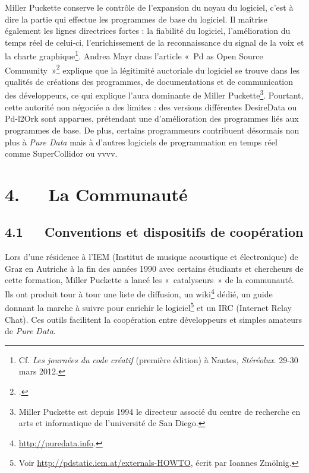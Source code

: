 \documentclass{FramateX}
\begin{document}
\begin{refsection}
Miller Puckette conserve le contrôle de l'expansion du noyau du
logiciel, c'est à dire la partie qui effectue les
programmes de base du logiciel. Il maîtrise également les lignes
directrices fortes : la fiabilité du logiciel, l'amélioration du temps
réel de celui-ci, l'enrichissement de la reconnaissance du signal de la
voix et la charte graphique\footnote{Cf. \textit{Les journées du code créatif}
(première édition) à Nantes, \textit{Stéréolux}. 29-30 mars 2012.}. Andrea
Mayr dans l'article «~Pd as Open Source Community~»\footnote{\cite{Mayr2004}.}
explique que la légitimité auctoriale du logiciel se trouve dans les
qualités de créations des programmes, de documentations et de
communication des développeurs, ce qui explique l'aura dominante de
Miller Puckette\footnote{Miller Puckette est depuis 1994 le directeur
associé du centre de recherche en arts et informatique de l'université
de San Diego.}. Pourtant, cette autorité non négociée a des limites :
des versions différentes DesireData ou Pd-l2Ork sont apparues,
prétendant une d'amélioration des programmes liés aux
programmes de base. De plus, certains programmeurs contribuent
désormais non plus à \textit{Pure Data} mais à d'autres
logiciels de programmation en temps réel comme SuperCollidor ou vvvv.

\section*{4.~~~La Communauté}
{}

\subsection*{4.1~~~Conventions et dispositifs de coopération}
{}

Lors d'une résidence à l'IEM (Institut de musique acoustique et
électronique) de Graz en Autriche à la fin des années 1990 avec
certains étudiants et chercheurs de cette formation, Miller Puckette a
lancé les «~catalyseurs~» de la communauté. Ils ont produit tour à tour
une liste de diffusion, un wiki\footnote{\url{http://puredata.info}.}
dédié, un guide donnant la marche à suivre pour enrichir le
logiciel\footnote{Voir \url{http://pdstatic.iem.at/externals-HOWTO}, écrit par
Ioannes Zmölnig.} et un IRC (Internet Relay Chat). Ces outils
facilitent la coopération entre développeurs et simples amateurs de
\textit{Pure Data}. 


\end{refsection}
\end{document}
